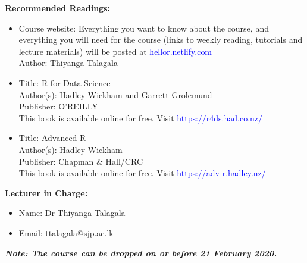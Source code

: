 \documentclass[a4paper,12pt]{article}
\begin{document}
\noindent\textbf{Recommended Readings:}
\begin{itemize}
	\setlength\itemsep{0.1mm}
	\item Course website: Everything you want to know about the course, and everything you will need for the course (links to weekly reading, tutorials and lecture materials) will be posted at \textcolor{blue}{hellor.netlify.com}\\
	Author: Thiyanga Talagala
	\item Title: R for Data Science \\
		  Author(s): Hadley Wickham and Garrett Grolemund \\
		  Publisher: O'REILLY \\
		  This book is available online for free. Visit \textcolor{blue}{https://r4ds.had.co.nz/}
		\item Title: Advanced R \\
		  Author(s): Hadley Wickham \\
		  Publisher: Chapman \& Hall/CRC \\
		  This book is available online for free. Visit \textcolor{blue}{https://adv-r.hadley.nz/}
\end{itemize}

\noindent\textbf{Lecturer in Charge:}

\begin{itemize}
	\setlength\itemsep{0.1mm}
	\item[] Name: Dr Thiyanga  Talagala
	\item[] Email: ttalagala@sjp.ac.lk
\end{itemize}


\noindent\textbf{\textit{Note: The course can be dropped on or before 21 February 2020.}}
\end{document}
